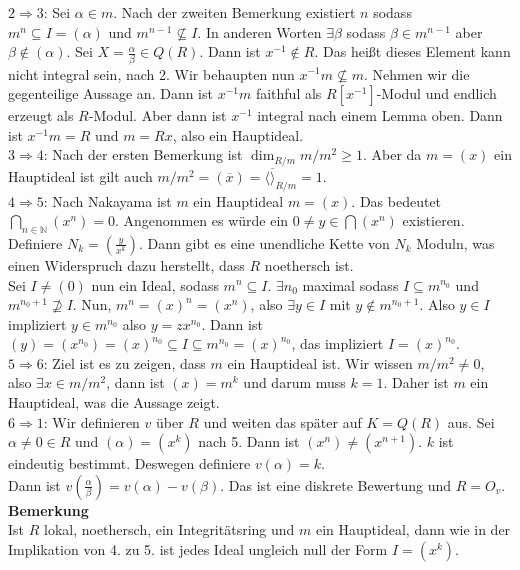 \documentclass[a4paper, 12pt]{article}
\begin{document}
$2 \Rightarrow 3$: Sei $\alpha \in m$. Nach der zweiten Bemerkung existiert $n$ sodass $m^n \subseteq I = (\alpha)$ und $m^{n-1} \not \subseteq I$. In anderen Worten $\exists \beta$ sodass $\beta \in m^{n-1}$ aber $\beta \notin (\alpha)$. Sei $X = \frac{\alpha}{\beta} \in Q(R)$. Dann ist $x^{-1} \notin R$. Das heißt dieses Element kann nicht integral sein, nach 2. Wir behaupten nun $x^{-1}m \not \subseteq m$. Nehmen wir die gegenteilige Aussage an. Dann ist $x^{-1}m$ faithful als $R[x^{-1}]$-Modul und endlich erzeugt als $R$-Modul. Aber dann ist $x^{-1}$ integral nach einem Lemma oben. Dann ist $x^{-1}m = R$ und $m = Rx$, also ein Hauptideal.\\
$3 \Rightarrow 4$: Nach der ersten Bemerkung ist $\dim_{R/m} m/m^2 \geq 1$. Aber da $m = (x)$ ein Hauptideal ist gilt auch $m/m^2 = (\overline{x}) = \langle \overline \rangle_{R/m} = 1$.\\
$4 \Rightarrow 5$: Nach Nakayama ist $m$ ein Hauptideal $m = (x)$. Das bedeutet $\bigcap_{n \in \mathbb{N}} (x^n) = 0$. Angenommen es würde ein $0 \neq y \in \bigcap (x^n)$ existieren. Definiere $N_k = (\frac{y}{x^k})$. Dann gibt es eine unendliche Kette von $N_k$ Moduln, was einen Widerspruch dazu herstellt, dass $R$ noethersch ist.\\
Sei $I \neq (0)$ nun ein Ideal, sodass $m^n \subseteq I$. $\exists n_0$ maximal sodass $I \subseteq m^{n_0}$ und $m^{n_0+1} \not \supseteq I$. Nun, $m^n = (x)^n = (x^n)$, also $\exists y \in I$ mit $y \notin m^{n_0+1}$. Also $y \in I$ impliziert $y \in m^{n_0}$ also $y = zx^{n_0}$. Dann ist $(y) = (x^{n_0}) = (x)^{n_0} \subseteq I \subseteq m^{n_0} = (x)^{n_0}$, das impliziert $I = (x)^{n_0}$.\\
$5 \Rightarrow 6$: Ziel ist es zu zeigen, dass $m$ ein Hauptideal ist. Wir wissen $m/m^2 \neq 0$, also $\exists x \in m/m^2$, dann ist $(x) = m^k$ und darum muss $k= 1$. Daher ist $m$ ein Hauptideal, was die Aussage zeigt.\\
$6 \Rightarrow 1$: Wir definieren $v$ über $R$ und weiten das später auf $K = Q(R)$ aus. Sei $\alpha \neq 0 \in R$ und $(\alpha) = (x^k)$ nach 5. Dann ist $(x^n) \neq (x^{n+1})$. $k$ ist eindeutig bestimmt. Deswegen definiere $v(\alpha) = k$.\\
Dann ist $v(\frac{\alpha}{\beta}) = v(\alpha) - v(\beta)$. Das ist eine diskrete Bewertung und $R=O_v$.\\
\textbf{Bemerkung}\\
Ist $R$ lokal, noethersch, ein Integritätsring und $m$ ein Hauptideal, dann wie in der Implikation von 4. zu 5. ist jedes Ideal ungleich null der Form $I = (x^k)$.\\
\end{document}
